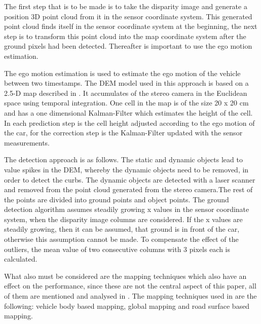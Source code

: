 \documentclass[conference]{IEEEtran}
\begin{document}
The first step that is to be made is to take the disparity image and generate a position 3D point cloud from it in the sensor coordinate system. This generated point cloud finds itself in the sensor coordinate system at the beginning, the next step is to transform this point cloud into the map coordinate system after the ground pixels had been detected. Thereafter is important to use the ego motion estimation. 

The ego motion estimation is used to estimate the ego motion of the vehicle between two timestamps. The DEM model used in this approach is based on a 2.5-D map described in \cite{bewegung}. It accumulates of the stereo camera in the Euclidean space using temporal integration. One cell in the map is of the size 20 x 20 cm and has a one dimensional Kalman-Filter which estimates the height of the cell. In each prediction step is the cell height adjusted according to the ego motion of the car, for the correction step is the Kalman-Filter updated with the sensor measurements. 

The detection approach is as follows. The static and dynamic objects lead to value spikes in the DEM, whereby the dynamic objects need to be removed, in order to detect the curbs. The dynamic objects are detected with a laser scanner and removed from the point cloud generated from the stereo camera.The rest of the points are divided into ground points and object points. The ground detection algorithm assumes steadily growing x values in the sensor coordinate system, when the disparity image columns are considered. If the x values are steadily growing, then it can be assumed, that ground is in front of the car, otherwise this assumption cannot be made. To compensate the effect of the outliers, the mean value of two consecutive columns with 3 pixels each is calculated.

What also must be considered are the mapping techniques which also have an effect on the performance, since these are not the central aspect of this paper, all of them are mentioned and analysed in \cite{stereo}. The mapping techniques used in \cite{stereo} are the following: vehicle body based mapping, global mapping and road surface based mapping. 
\end{document}
